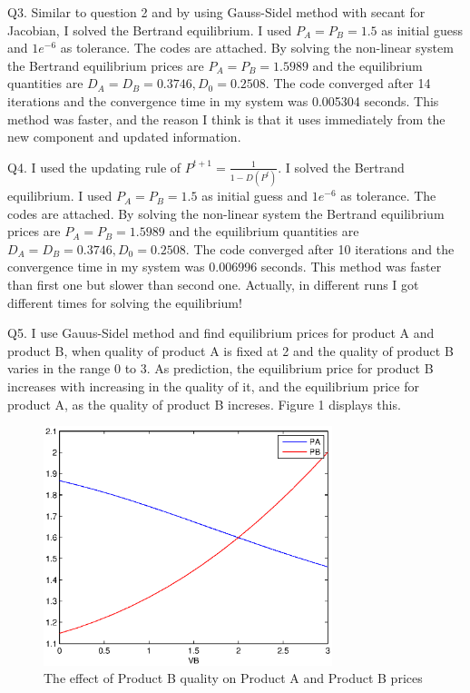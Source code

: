\documentclass{report}
\begin{document}
Q3. Similar to question 2 and by using Gauss-Sidel method with secant for Jacobian, I solved the Bertrand equilibrium. I used $P_{A}=P_{B}=1.5$ as initial guess and $1e^{-6}$ as tolerance. The codes are attached. By solving the non-linear system the Bertrand equilibrium prices are $P_{A}=P_{B}=1.5989$ and the equilibrium quantities are $D_{A}=D_{B}=0.3746, D_{0}=0.2508$. The code converged after 14 iterations and the convergence time in my system was   0.005304 seconds. This method was faster, and the reason I think is that it uses immediately from the new component and updated information. 

Q4. I used the updating rule of $P^{t+1}=\frac{1}{1-D(P^{t})}$. I solved the Bertrand equilibrium. I used $P_{A}=P_{B}=1.5$ as initial guess and $1e^{-6}$ as tolerance. The codes are attached. By solving the non-linear system the Bertrand equilibrium prices are $P_{A}=P_{B}=1.5989$ and the equilibrium quantities are $D_{A}=D_{B}=0.3746, D_{0}=0.2508$. The code converged after 10 iterations and the convergence time in my system was  0.006996 seconds. This method was faster than first one but slower than second one. Actually, in different runs I got different times for solving the equilibrium!

Q5. 
 I use Gauus-Sidel method and find equilibrium prices for product A and product B, when quality of product A is fixed at 2 and the quality of product B varies in the range 0 to 3. As prediction, the equilibrium price for product B increases with increasing in the quality of it, and the equilibrium price for product A, as the quality of product B increses. Figure 1 displays this. 
 \begin{figure}
 \centering
 \includegraphics[width=0.75\textwidth]{FIGQ5}
 \caption{The effect of Product B quality on Product A and Product B prices}\label{figq1}
 \end{figure}
\end{document}
